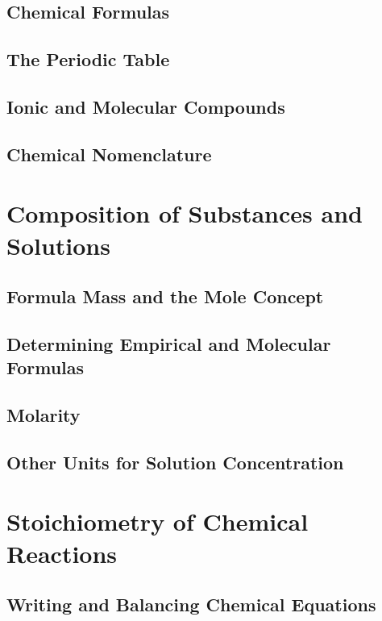 \documentclass[12pt, openany, letterpaper]{memoir}
\begin{document}
\section{Chemical Formulas}

\section{The Periodic Table}

\section{Ionic and Molecular Compounds}

\section{Chemical Nomenclature}

\chapter{Composition of Substances and Solutions}

\section{Formula Mass and the Mole Concept}

\section{Determining Empirical and Molecular Formulas}

\section{Molarity}

\section{Other Units for Solution Concentration}

\chapter{Stoichiometry of Chemical Reactions}

\section{Writing and Balancing Chemical Equations}
\end{document}
